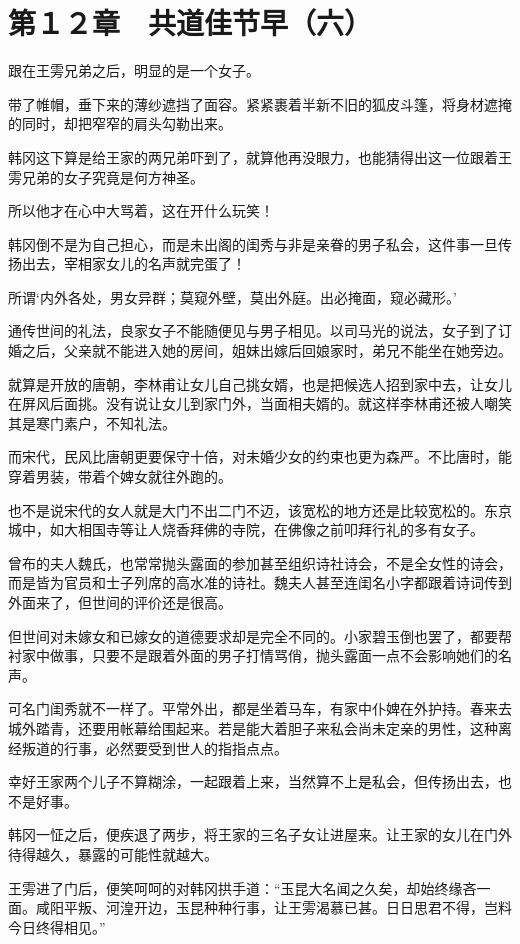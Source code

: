 \section{第１２章　共道佳节早（六）}

跟在王雱兄弟之后，明显的是一个女子。

带了帷帽，垂下来的薄纱遮挡了面容。紧紧裹着半新不旧的狐皮斗篷，将身材遮掩的同时，却把窄窄的肩头勾勒出来。

韩冈这下算是给王家的两兄弟吓到了，就算他再没眼力，也能猜得出这一位跟着王雱兄弟的女子究竟是何方神圣。

所以他才在心中大骂着，这在开什么玩笑！

韩冈倒不是为自己担心，而是未出阁的闺秀与非是亲眷的男子私会，这件事一旦传扬出去，宰相家女儿的名声就完蛋了！

所谓‘内外各处，男女异群；莫窥外壁，莫出外庭。出必掩面，窥必藏形。’

通传世间的礼法，良家女子不能随便见与男子相见。以司马光的说法，女子到了订婚之后，父亲就不能进入她的房间，姐妹出嫁后回娘家时，弟兄不能坐在她旁边。

就算是开放的唐朝，李林甫让女儿自己挑女婿，也是把候选人招到家中去，让女儿在屏风后面挑。没有说让女儿到家门外，当面相夫婿的。就这样李林甫还被人嘲笑其是寒门素户，不知礼法。

而宋代，民风比唐朝更要保守十倍，对未婚少女的约束也更为森严。不比唐时，能穿着男装，带着个婢女就往外跑的。

也不是说宋代的女人就是大门不出二门不迈，该宽松的地方还是比较宽松的。东京城中，如大相国寺等让人烧香拜佛的寺院，在佛像之前叩拜行礼的多有女子。

曾布的夫人魏氏，也常常抛头露面的参加甚至组织诗社诗会，不是全女性的诗会，而是皆为官员和士子列席的高水准的诗社。魏夫人甚至连闺名小字都跟着诗词传到外面来了，但世间的评价还是很高。

但世间对未嫁女和已嫁女的道德要求却是完全不同的。小家碧玉倒也罢了，都要帮衬家中做事，只要不是跟着外面的男子打情骂俏，抛头露面一点不会影响她们的名声。

可名门闺秀就不一样了。平常外出，都是坐着马车，有家中仆婢在外护持。春来去城外踏青，还要用帐幕给围起来。若是能大着胆子来私会尚未定亲的男性，这种离经叛道的行事，必然要受到世人的指指点点。

幸好王家两个儿子不算糊涂，一起跟着上来，当然算不上是私会，但传扬出去，也不是好事。

韩冈一怔之后，便疾退了两步，将王家的三名子女让进屋来。让王家的女儿在门外待得越久，暴露的可能性就越大。

王雱进了门后，便笑呵呵的对韩冈拱手道：“玉昆大名闻之久矣，却始终缘吝一面。咸阳平叛、河湟开边，玉昆种种行事，让王雱渴慕已甚。日日思君不得，岂料今日终得相见。”

